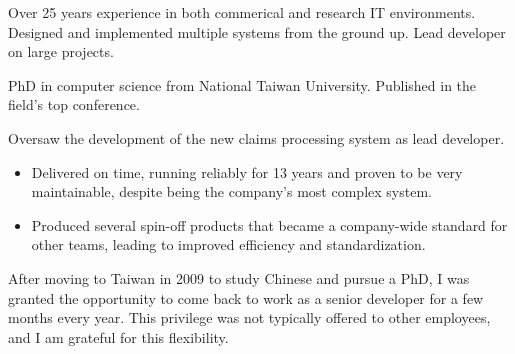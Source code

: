 \documentclass[10pt,a4paper]{../altacv}
\begin{document}

\begin{fullwidth}
\makecvheader

Over 25 years experience in both commerical and research IT environments. Designed and implemented multiple systems from the ground up. Lead developer on large projects.

PhD in computer science from National Taiwan University. Published in the field’s top conference. 

\end{fullwidth}

\small



Oversaw the development of the new claims processing system as lead developer.

\medskip

\begin{itemize}
	\item Delivered on time, running reliably for 13 years and proven to be very maintainable, despite being the company's most complex system.
	\item Produced several spin-off products that became a company-wide standard for other teams, leading to improved efficiency and standardization.
\end{itemize}

\medskip

After moving to Taiwan in 2009 to study Chinese and pursue a PhD, I was granted the opportunity to come back to work as a senior developer for a few months every year. This privilege was not typically offered to other employees, and I am grateful for this flexibility.
\end{document}
